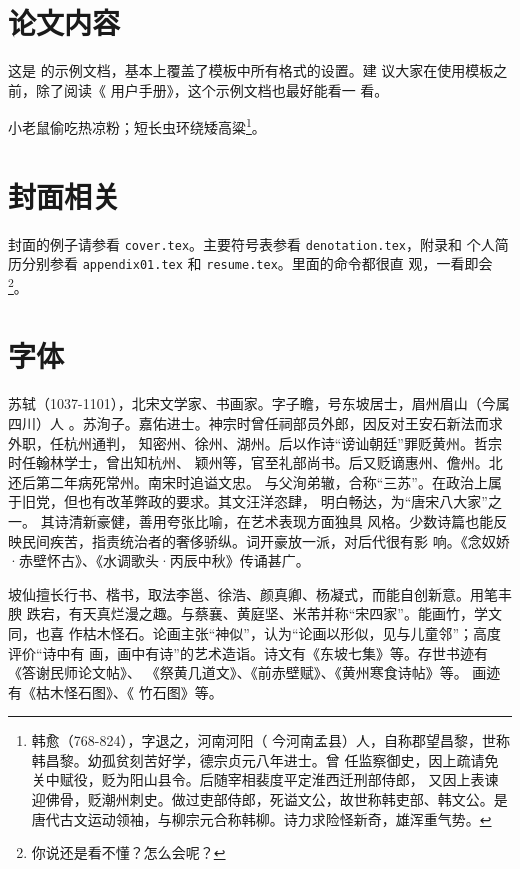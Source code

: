 \section{论文内容}

这是 \thuthesis\cite{thuthesis} 的示例文档，基本上覆盖了模板中所有格式的设置。建
议大家在使用模板之前，除了阅读《\thuthesis{} 用户手册》，这个示例文档也最好能看一
看。

小老鼠偷吃热凉粉；短长虫环绕矮高粱\footnote{韩愈（768-824），字退之，河南河阳（
  今河南孟县）人，自称郡望昌黎，世称韩昌黎。幼孤贫刻苦好学，德宗贞元八年进士。曾
  任监察御史，因上疏请免关中赋役，贬为阳山县令。后随宰相裴度平定淮西迁刑部侍郎，
  又因上表谏迎佛骨，贬潮州刺史。做过吏部侍郎，死谥文公，故世称韩吏部、韩文公。是
  唐代古文运动领袖，与柳宗元合称韩柳。诗力求险怪新奇，雄浑重气势。}。


\section{封面相关}
封面的例子请参看 \texttt{cover.tex}。主要符号表参看 \texttt{denotation.tex}，附录和
个人简历分别参看 \texttt{appendix01.tex} 和 \texttt{resume.tex}。里面的命令都很直
观，一看即会\footnote{你说还是看不懂？怎么会呢？}。

\section{字体}
\label{sec:first}

苏轼（1037-1101），北宋文学家、书画家。字子瞻，号东坡居士，眉州眉山（今属四川）人
。苏洵子。嘉佑进士。神宗时曾任祠部员外郎，因反对王安石新法而求外职，任杭州通判，
知密州、徐州、湖州。后以作诗“谤讪朝廷”罪贬黄州。哲宗时任翰林学士，曾出知杭州、
颖州等，官至礼部尚书。后又贬谪惠州、儋州。北还后第二年病死常州。南宋时追谥文忠。
与父洵弟辙，合称“三苏”。在政治上属于旧党，但也有改革弊政的要求。其文汪洋恣肆，
明白畅达，为“唐宋八大家”之一。  其诗清新豪健，善用夸张比喻，在艺术表现方面独具
风格。少数诗篇也能反映民间疾苦，指责统治者的奢侈骄纵。词开豪放一派，对后代很有影
响。《念奴娇·赤壁怀古》、《水调歌头·丙辰中秋》传诵甚广。

{\kaishu 坡仙擅长行书、楷书，取法李邕、徐浩、颜真卿、杨凝式，而能自创新意。用笔丰腴
  跌宕，有天真烂漫之趣。与蔡襄、黄庭坚、米芾并称“宋四家”。能画竹，学文同，也喜
  作枯木怪石。论画主张“神似”，认为“论画以形似，见与儿童邻”；高度评价“诗中有
  画，画中有诗”的艺术造诣。诗文有《东坡七集》等。存世书迹有《答谢民师论文帖》、
  《祭黄几道文》、《前赤壁赋》、《黄州寒食诗帖》等。  画迹有《枯木怪石图》、《
  竹石图》等。}

